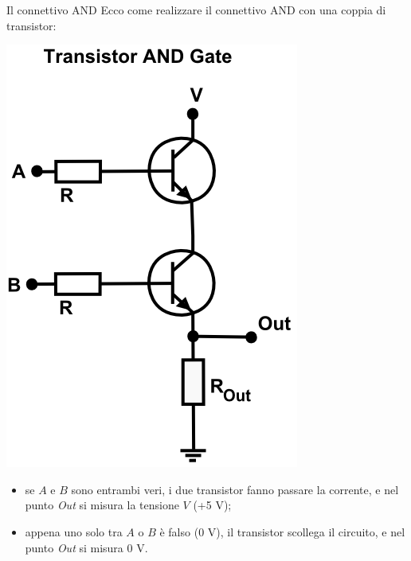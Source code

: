 \documentclass[aspectratio=169,10pt,dvipsnames,xcolor=table,handout]{beamer}
\begin{document}
\begin{frame}{Il connettivo AND}
    Ecco come realizzare il connettivo AND con una coppia di transistor:
    \begin{center}
        \includegraphics[height=0.5\textheight]{TransistorANDgate.png}
    \end{center}
    \begin{itemize}
        \item se $A$ e $B$ sono entrambi veri, i due transistor fanno passare la corrente, e nel punto \textit{Out} si misura la tensione $V$ (+5 V);
        \item appena uno solo tra $A$ o $B$ è falso (0 V), il transistor scollega il circuito, e nel punto \textit{Out} si misura 0 V.
    \end{itemize}
\end{frame}
\end{document}
